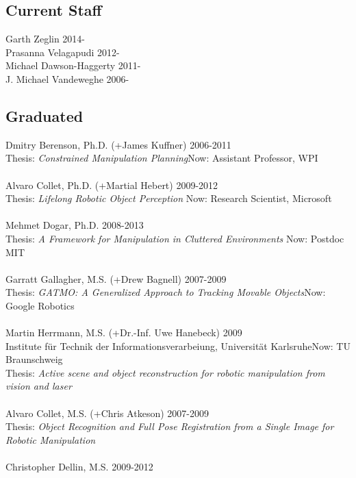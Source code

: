 \documentclass[10pt]{article}
\begin{document}
\subsection{Current Staff}
\noindent
Garth Zeglin \hfill 2014-\\
Prasanna Velagapudi \hfill 2012-\\
Michael Dawson-Haggerty \hfill 2011-\\
J. Michael Vandeweghe \hfill 2006-\\


\subsection{Graduated}
\noindent
Dmitry Berenson, Ph.D. (+James Kuffner) \hfill 2006-2011\\
Thesis: \textit{Constrained Manipulation Planning}\hfill Now: Assistant Professor, WPI\\
\\
Alvaro Collet, Ph.D. (+Martial Hebert) \hfill 2009-2012\\
Thesis: \textit{Lifelong Robotic Object Perception} \hfill Now: Research Scientist, Microsoft\\
\\
Mehmet Dogar, Ph.D. \hfill 2008-2013\\
Thesis: \textit{A Framework for Manipulation in Cluttered Environments} \hfill Now: Postdoc MIT\\
\\
Garratt Gallagher, M.S. (+Drew Bagnell) \hfill 2007-2009\\ 
Thesis: \textit{GATMO: A Generalized Approach to Tracking Movable Objects}\hfill Now: Google Robotics\\
\\
Martin Herrmann, M.S. (+Dr.-Inf. Uwe Hanebeck) \hfill 2009\\
Institute f\"ur Technik der Informationsverarbeiung, Universit\"at Karlsruhe\hfill Now: TU Braunschweig\\
Thesis: \textit{Active scene and object reconstruction for robotic manipulation from vision and laser}\\
\\
Alvaro Collet, M.S. (+Chris Atkeson) \hfill 2007-2009\\
Thesis: \textit{Object Recognition and Full Pose Registration from a Single Image for Robotic Manipulation}\\
\\
Christopher Dellin, M.S. \hfill 2009-2012\\
\end{document}
